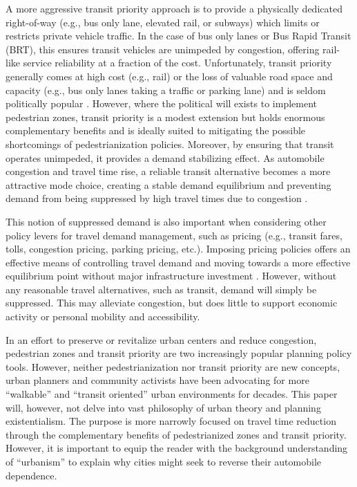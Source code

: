 \documentclass{elsarticle}\usepackage[]{graphicx}\usepackage[]{color}
\begin{document}
A more aggressive transit priority approach is to provide a physically dedicated right-of-way (e.g., bus only lane, elevated rail, or subways) which limits or restricts private vehicle traffic. In the case of bus only lanes or Bus Rapid Transit (BRT), this ensures transit vehicles are unimpeded by congestion, offering rail-like service reliability at a fraction of the cost. Unfortunately, transit priority generally comes at high cost (e.g., rail) or the loss of valuable road space and capacity (e.g., bus only lanes taking a traffic or parking lane) and is seldom politically popular \cite{Nash2003}. However, where the political will exists to implement pedestrian zones, transit priority is a modest extension but holds enormous complementary benefits and is ideally suited to mitigating the possible shortcomings of pedestrianization policies. Moreover, by ensuring that transit operates unimpeded, it provides a demand stabilizing effect. As automobile congestion and travel time rise, a reliable transit alternative becomes a more attractive mode choice, creating a stable demand equilibrium and preventing demand from being suppressed by high travel times due to congestion \cite{Wardrop1952,Gonzales2013,Tabuchi1993,Vickrey1969}. 

This notion of suppressed demand is also important when considering other policy levers for travel demand management, such as pricing (e.g., transit fares, tolls, congestion pricing, parking pricing, etc.). Imposing pricing policies offers an effective means of controlling travel demand and moving towards a more effective equilibrium point without major infrastructure investment \citep{Li2014, Lou2010, Huang2002, Wang2004, Yang1997, Zheng2012, Huang2000, Gonzales2012, Danielis2002}. However, without any reasonable travel alternatives, such as transit, demand will simply be suppressed. This may alleviate congestion, but does little to support economic activity or personal mobility and accessibility.

In an effort to preserve or revitalize urban centers and reduce congestion, pedestrian zones and transit priority are two increasingly popular planning policy tools. However, neither pedestrianization nor transit priority are new concepts, urban planners and community activists have been advocating for more ``walkable'' \citep{Brambilla1977,Pushkarev1975,Engwicht2007} and ``transit oriented'' \citep{Owen1972,Walbridge1977} urban environments for decades. This paper will, however, not delve into vast philosophy of urban theory and planning existentialism. The purpose is more narrowly focused on travel time reduction through the complementary benefits of pedestrianized zones and transit priority. However, it is important to equip the reader with the background understanding of ``urbanism'' to explain why cities might seek to reverse their automobile dependence. 
\end{document}
